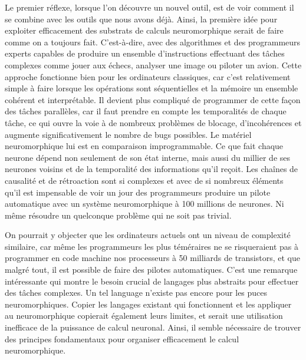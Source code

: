 	Le premier réflexe, lorsque l'on découvre un nouvel outil, est de voir comment il se combine avec les outils que nous avons déjà. Ainsi, la première idée pour exploiter efficacement des substrats de calculs neuromorphique serait de faire comme on a toujours fait. C'est-à-dire, avec des algorithmes et des programmeurs experts capables de produire un ensemble d'instructions effectuant des tâches complexes comme jouer aux échecs, analyser une image ou piloter un avion. Cette approche fonctionne bien pour les ordinateurs classiques, car c'est relativement simple à faire lorsque les opérations sont séquentielles et la mémoire un ensemble cohérent et interprétable. Il devient plus compliqué de programmer de cette façon des tâches parallèles, car il faut prendre en compte les temporalités de chaque tâche, ce qui ouvre la voie à de nombreux problèmes de blocage, d'incohérences et augmente significativement le nombre de bugs possibles. Le matériel neuromorphique lui est en comparaison improgrammable. Ce que fait chaque neurone dépend non seulement de son état interne, mais aussi du millier de ses neurones voisins et de la temporalité des informations qu'il reçoit. Les chaînes de causalité et de rétroaction sont si complexes et avec de si nombreux éléments qu'il est impensable de voir un jour des programmeurs produire un pilote automatique avec un système neuromorphique à 100 millions de neurones. Ni même résoudre un quelconque problème qui ne soit pas trivial.

	On pourrait y objecter que les ordinateurs actuels ont un niveau de complexité similaire, car même les programmeurs les plus téméraires ne se risqueraient pas à programmer en code machine nos processeurs à 50 milliards de transistors, et que malgré tout, il est possible de faire des pilotes automatiques. C'est une remarque intéressante qui montre le besoin crucial de langages plus abstraits pour effectuer des tâches complexes. Un tel language n'existe pas encore pour les puces neuromorphiques. Copier les langages existant qui fonctionnent et les appliquer au neuromorphique copierait également leurs limites, et serait une utilisation inefficace de la puissance de calcul neuronal. Ainsi, il semble nécessaire de trouver des principes fondamentaux pour organiser efficacement le calcul neuromorphique.

